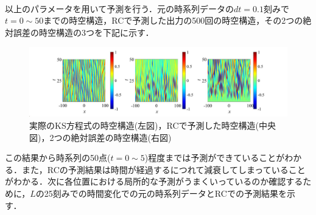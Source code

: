 \documentclass[autodetect-engine,dvipdfmx-if-dvi,ja=standard,a4paper,11pt]{bxjsarticle} %
\begin{document}
\\
\　以上のパラメータを用いて予測を行う．元の時系列データの$dt=0.1$刻みで$t=0\sim50$までの時空構造，RCで予測した出力の500回の時空構造，その2つの絶対誤差の時空構造の3つを下記に示す．
\begin{figure}[H]%
\begin{center}
\includegraphics[width=.9\textwidth]{KS_error2.jpg} 
\end{center}
\caption{実際のKS方程式の時空構造(左図)，RCで予測した時空構造(中央図)，2つの絶対誤差の時空構造(右図)}%
\label{fig:KSRC}%
\end{figure}
この結果から時系列の50点($t=0\sim5$)程度までは予測ができていることがわかる．また，RCの予測結果は時間が経過するにつれて減衰してしまっていることがわかる．次に各位置における局所的な予測がうまくいっているのか確認するために，$L$の25刻みでの時間変化での元の時系列データとRCでの予測結果を示す．
\end{document}
